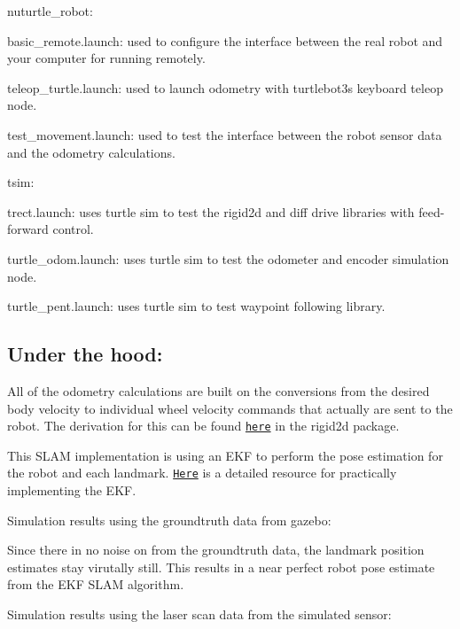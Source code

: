 {\ttfamily nuturtle\+\_\+robot}\+:
\begin{DoxyItemize}
\item {\ttfamily basic\+\_\+remote.\+launch}\+: used to configure the interface between the real robot and your computer for running remotely.
\item {\ttfamily teleop\+\_\+turtle.\+launch}\+: used to launch odometry with turtlebot3\textquotesingle{}s keyboard teleop node.
\item {\ttfamily test\+\_\+movement.\+launch}\+: used to test the interface between the robot sensor data and the odometry calculations.
\end{DoxyItemize}

{\ttfamily tsim}\+:
\begin{DoxyItemize}
\item {\ttfamily trect.\+launch}\+: uses turtle sim to test the rigid2d and diff drive libraries with feed-\/forward control.
\item {\ttfamily turtle\+\_\+odom.\+launch}\+: uses turtle sim to test the odometer and encoder simulation node.
\item {\ttfamily turtle\+\_\+pent.\+launch}\+: uses turtle sim to test waypoint following library.
\end{DoxyItemize}

\subsection*{Under the hood\+:}

All of the odometry calculations are built on the conversions from the desired body velocity to individual wheel velocity commands that actually are sent to the robot. The derivation for this can be found \href{nuturtle_robot/doc/Kinematics.pdf}{\tt here} in the rigid2d package.

This S\+L\+AM implementation is using an E\+KF to perform the pose estimation for the robot and each landmark. \href{https://nu-msr.github.io/navigation_site/slam.pdf}{\tt Here} is a detailed resource for practically implementing the E\+KF.

Simulation results using the groundtruth data from gazebo\+:

 Since there in no noise on from the groundtruth data, the landmark position estimates stay virutally still. This results in a near perfect robot pose estimate from the E\+KF S\+L\+AM algorithm.

Simulation results using the laser scan data from the simulated sensor\+:

